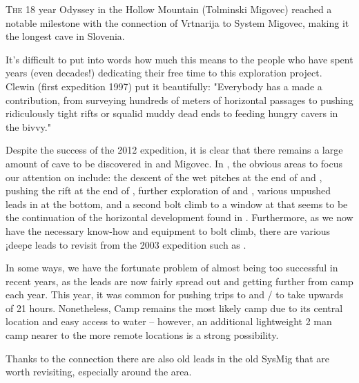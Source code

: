 \thispagestyle{endchapter}

\begin{tcolorbox}
\vspace{80pt}

\lettrine{T}{he} 18 year Odyssey in the Hollow Mountain (Tolminski Migovec) reached a notable milestone with the connection of Vrtnarija to System Migovec, making it the longest cave in Slovenia.

It's difficult to put into words how much this means to the people who have spent years (even decades!) dedicating their free time to this exploration project. Clewin (first expedition 1997) put it beautifully: "Everybody has a made a contribution, from surveying hundreds of meters of horizontal passages to pushing ridiculously tight rifts or squalid muddy dead ends to feeding hungry cavers in the bivvy."

Despite the success of the 2012 expedition, it is clear that there
remains a large amount of cave to be discovered in  and
Migovec. In , the obvious areas to focus our attention
on include: the descent of the wet pitches at the end of  and , pushing the rift at the end of , further exploration of  and ,
various unpushed leads in  at the bottom, and a
second bolt climb to a window at  that seems to
be the continuation of the horizontal development found in .
Furthermore, as we now have the necessary know-how and equipment to bolt
climb, there are various ¡deep¢ leads to revisit from the 2003
expedition such as .

In some ways, we have the fortunate problem of almost being too
successful in recent years, as the leads are now fairly spread out and
getting further from camp each year. This year, it was common for
pushing trips to  and
/ to take upwards of 21 hours.
Nonetheless, Camp  remains the most likely camp due to its
central location and easy access to water -- however, an additional
lightweight 2 man camp nearer to the more remote locations is a strong
possibility.

Thanks to the connection there are also old leads in the old SysMig that
are worth revisiting, especially around the  area.





\end{tcolorbox}
\BgThispage
